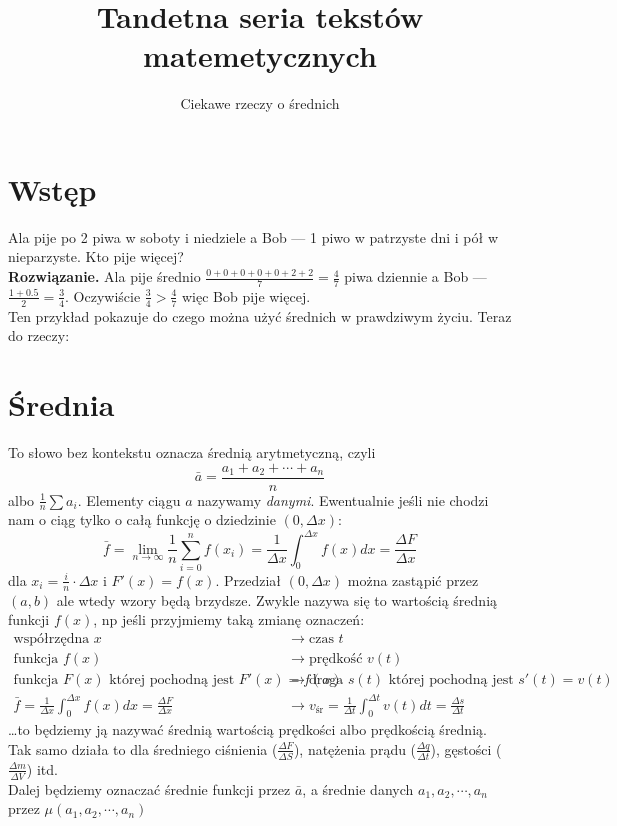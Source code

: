 \documentclass{article}
\title{Tandetna seria tekstów matemetycznych}
\author{Ciekawe rzeczy o średnich}
\begin{document}
\maketitle
\section{Wstęp}
Ala pije po 2 piwa w soboty i niedziele a Bob --- 1 piwo w patrzyste dni i pół w nieparzyste. Kto pije więcej?\\
\textbf{Rozwiązanie.} Ala pije średnio $\frac{0+0+0+0+0+2+2}7=\frac47$ piwa dziennie a Bob --- $\frac{1+0.5}2=\frac34$. Oczywiście $\frac34>\frac47$ więc Bob pije więcej.\\
Ten przykład pokazuje do czego można użyć średnich w prawdziwym życiu. Teraz do rzeczy:
\section{Średnia}
To słowo bez kontekstu oznacza średnią arytmetyczną, czyli\[\bar a = \frac{a_1+a_2+\cdots+a_n}n\]albo $\frac1n\sum a_i$. Elementy ciągu $a$ nazywamy \textit{danymi}.
Ewentualnie jeśli nie chodzi nam o ciąg tylko o całą funkcję o dziedzinie $(0, \Delta x)$:
\[\bar f = \lim_{n\to\infty}\frac1n\sum_{i=0}^{n} f(x_i) = \frac1{\Delta x}\int_0^{\Delta x}f(x)dx = \frac{\Delta F}{\Delta x}\]
dla $x_i=\frac in\cdot\Delta x$ i $F'(x)=f(x)$.
Przedział $(0, \Delta x)$ można zastąpić przez $(a, b)$ ale wtedy wzory będą brzydsze. 
Zwykle nazywa się to wartością średnią funkcji $f(x)$, np jeśli przyjmiemy taką zmianę oznaczeń:
\begin{align*}
	\text{współrzędna } x &\to \text{czas }t\\
	\text{funkcja }f(x) &\to \text{prędkość }v(t)\\
	\text{funkcja }F(x)\text{ której pochodną jest }F'(x)=f(x) &\to \text{droga }s(t)\text{ której pochodną jest }s'(t)=v(t)\\
	\bar f = \frac1{\Delta x}\int_0^{\Delta x}f(x)dx = \frac{\Delta F}{\Delta x} &\to v_\text{śr} = \frac1{\Delta t}\int_0^{\Delta t}v(t)dt = \frac{\Delta s}{\Delta t}
\end{align*}
…to będziemy ją nazywać średnią wartością prędkości albo prędkością średnią.
Tak samo działa to dla średniego ciśnienia ($\frac{\Delta F}{\Delta S}$), natężenia prądu ($\frac{\Delta q}{\Delta t}$), gęstości ($\frac{\Delta m}{\Delta V}$) itd.\\
Dalej będziemy oznaczać średnie funkcji przez $\bar a$, a średnie danych $a_1, a_2, \cdots, a_n$ przez $\mu(a_1, a_2, \cdots, a_n)$
\end{document}
